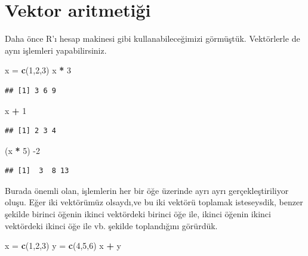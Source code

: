 \documentclass[
]{book}
\newenvironment{Shaded}{\begin{snugshade}}{\end{snugshade}}
\newcommand{\DecValTok}[1]{\textcolor[rgb]{0.00,0.00,0.81}{#1}}
\newcommand{\KeywordTok}[1]{\textcolor[rgb]{0.13,0.29,0.53}{\textbf{#1}}}
\newcommand{\NormalTok}[1]{#1}
\newcommand{\OperatorTok}[1]{\textcolor[rgb]{0.81,0.36,0.00}{\textbf{#1}}}
\newcommand{\StringTok}[1]{\textcolor[rgb]{0.31,0.60,0.02}{#1}}
\begin{document}
\hypertarget{vektor-aritmetiux11fi}{%
\section{Vektor aritmetiği}\label{vektor-aritmetiux11fi}}

Daha önce R'ı hesap makinesi gibi kullanabileceğimizi görmüştük. Vektörlerle de aynı işlemleri yapabilirsiniz.

\begin{Shaded}
\begin{Highlighting}[]
\NormalTok{x =}\StringTok{ }\KeywordTok{c}\NormalTok{(}\DecValTok{1}\NormalTok{,}\DecValTok{2}\NormalTok{,}\DecValTok{3}\NormalTok{)}
\NormalTok{x }\OperatorTok{*}\StringTok{ }\DecValTok{3}
\end{Highlighting}
\end{Shaded}

\begin{verbatim}
## [1] 3 6 9
\end{verbatim}

\begin{Shaded}
\begin{Highlighting}[]
\NormalTok{x }\OperatorTok{+}\StringTok{ }\DecValTok{1}
\end{Highlighting}
\end{Shaded}

\begin{verbatim}
## [1] 2 3 4
\end{verbatim}

\begin{Shaded}
\begin{Highlighting}[]
\NormalTok{(x }\OperatorTok{*}\StringTok{ }\DecValTok{5}\NormalTok{) }\DecValTok{{-}2}
\end{Highlighting}
\end{Shaded}

\begin{verbatim}
## [1]  3  8 13
\end{verbatim}

Burada önemli olan, işlemlerin her bir öğe üzerinde ayrı ayrı gerçekleştiriliyor oluşu. Eğer iki vektörümüz olsaydı,ve bu iki vektörü toplamak isteseysdik, benzer şekilde birinci öğenin ikinci vektördeki birinci öğe ile, ikinci öğenin ikinci vektördeki ikinci öğe ile vb. şekilde toplandığını görürdük.

\begin{Shaded}
\begin{Highlighting}[]
\NormalTok{x =}\StringTok{ }\KeywordTok{c}\NormalTok{(}\DecValTok{1}\NormalTok{,}\DecValTok{2}\NormalTok{,}\DecValTok{3}\NormalTok{)}
\NormalTok{y =}\StringTok{ }\KeywordTok{c}\NormalTok{(}\DecValTok{4}\NormalTok{,}\DecValTok{5}\NormalTok{,}\DecValTok{6}\NormalTok{)}
\NormalTok{x }\OperatorTok{+}\StringTok{ }\NormalTok{y}
\end{Highlighting}
\end{Shaded}
\end{document}
